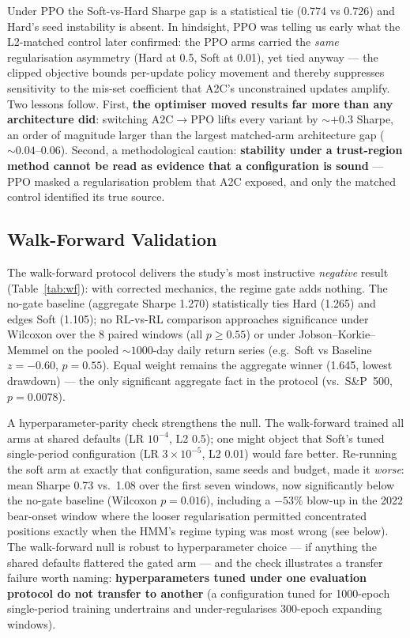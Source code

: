 \documentclass[sigconf,anonymous,review]{acmart}
\begin{document}
Under PPO the Soft-vs-Hard Sharpe gap is a statistical tie (0.774 vs
0.726) and Hard's seed instability is absent. In hindsight, PPO was
telling us early what the L2-matched control later confirmed: the PPO
arms carried the \emph{same} regularisation asymmetry (Hard at 0.5, Soft
at 0.01), yet tied anyway --- the clipped objective bounds per-update
policy movement and thereby suppresses sensitivity to the mis-set
coefficient that A2C's unconstrained updates amplify. Two lessons
follow. First, \textbf{the optimiser moved results far more than any
architecture did}: switching A2C$\rightarrow$PPO lifts every variant by
${\sim}{+}0.3$ Sharpe, an order of magnitude larger than the largest
matched-arm architecture gap (${\sim}0.04$--$0.06$). Second, a
methodological caution: \textbf{stability under a trust-region method
cannot be read as evidence that a configuration is sound} --- PPO masked
a regularisation problem that A2C exposed, and only the matched control
identified its true source.

\subsection{Walk-Forward Validation}
\label{sec:results-wf}

The walk-forward protocol delivers the study's most instructive
\emph{negative} result (Table~\ref{tab:wf}): with corrected mechanics,
the regime gate adds nothing. The no-gate baseline (aggregate Sharpe
1.270) statistically ties Hard (1.265) and edges Soft (1.105); no
RL-vs-RL comparison approaches significance under Wilcoxon over the 8
paired windows (all $p \geq 0.55$) or under Jobson--Korkie--Memmel on
the pooled ${\sim}1000$-day daily return series (e.g.\ Soft vs Baseline
$z{=}{-}0.60$, $p{=}0.55$). Equal weight remains the aggregate winner
(1.645, lowest drawdown) --- the only significant aggregate fact in the
protocol (vs.\ S\&P~500, $p{=}0.0078$).

A hyperparameter-parity check strengthens the null. The walk-forward
trained all arms at shared defaults (LR $10^{-4}$, L2 0.5); one might
object that Soft's tuned single-period configuration (LR
$3{\times}10^{-5}$, L2 0.01) would fare better. Re-running the soft arm
at exactly that configuration, same seeds and budget, made it
\emph{worse}: mean Sharpe 0.73 vs.\ 1.08 over the first seven windows,
now significantly below the no-gate baseline (Wilcoxon $p{=}0.016$),
including a $-53\%$ blow-up in the 2022 bear-onset window where the
looser regularisation permitted concentrated positions exactly when the
HMM's regime typing was most wrong (see below). The walk-forward null is
robust to hyperparameter choice --- if anything the shared defaults
flattered the gated arm --- and the check illustrates a transfer
failure worth naming: \textbf{hyperparameters tuned under one evaluation
protocol do not transfer to another} (a configuration tuned for
1000-epoch single-period training undertrains and under-regularises
300-epoch expanding windows).
\end{document}
